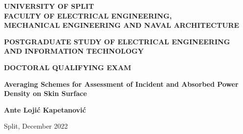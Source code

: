 \protect\thispagestyle{empty}
\begin{titlepage}
\begin{center}

\normalsize
\textbf{UNIVERSITY OF SPLIT\\
FACULTY OF ELECTRICAL ENGINEERING,\\MECHANICAL ENGINEERING AND NAVAL ARCHITECTURE}

\vspace{1cm}

\textbf{POSTGRADUATE STUDY OF ELECTRICAL ENGINEERING AND INFORMATION TECHNOLOGY}

\vfill

\textbf{DOCTORAL QUALIFYING EXAM}

\vspace{2cm}

\Large
\textbf{Averaging Schemes for Assessment of Incident and Absorbed Power Density on Skin Surface}

\vspace{2cm}

\normalsize 
\textbf{Ante Lojić Kapetanović}

\vfill

\normalsize
Split, December 2022

\end{center}
\end{titlepage}